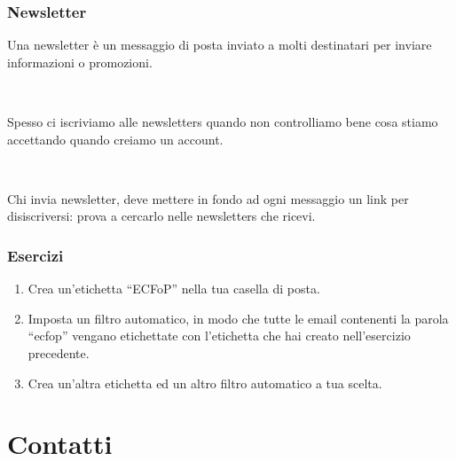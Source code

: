 \documentclass[handout]{beamer}
\begin{document}
\begin{frame}
\frametitle{Newsletter}
Una \alert{newsletter} è un messaggio di posta inviato a molti destinatari per inviare informazioni o promozioni.\pause

~

Spesso ci iscriviamo alle newsletters quando non controlliamo bene cosa stiamo accettando quando creiamo un account.\pause

~

Chi invia newsletter, deve mettere in fondo ad ogni messaggio un \alert{link per disiscriversi}: prova a cercarlo nelle newsletters che ricevi.

\end{frame}



\begin{frame}
\frametitle{Esercizi}
\begin{enumerate}
  \item Crea un'etichetta ``ECFoP'' nella tua casella di posta.
  \item Imposta un filtro automatico, in modo che tutte le email contenenti la parola ``ecfop'' vengano etichettate con l'etichetta che hai creato nell'esercizio precedente.
  \item Crea un'altra etichetta ed un altro filtro automatico a tua scelta.
\end{enumerate}
\end{frame}



\section{Contatti}
\end{document}
